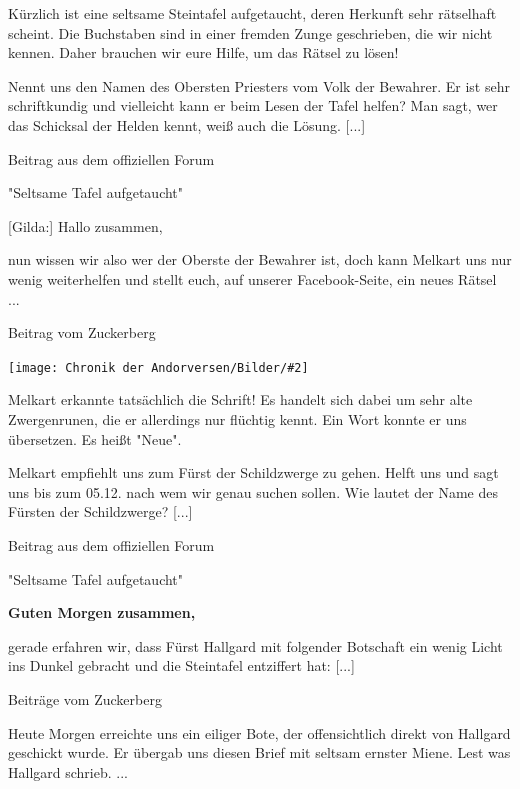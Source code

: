\documentclass[10pt, a4paper, oneside]{book}
\newcommand{\bildmitts}[2][height=0.32\textwidth,width=0.48\textwidth,keepaspectratio]{%
    \begin{center}
        \texttt{[image: Chronik der Andorversen/Bilder/\#2]}
    \end{center}
}
\begin{document}
\begin{multicols}{2}
Kürzlich ist eine seltsame Steintafel aufgetaucht, deren Herkunft sehr rätselhaft scheint. Die Buchstaben sind in einer fremden Zunge geschrieben, die wir nicht kennen. Daher brauchen wir eure Hilfe, um das Rätsel zu lösen!

Nennt uns den Namen des Obersten Priesters vom Volk der Bewahrer. Er ist sehr schriftkundig und vielleicht kann er beim Lesen der Tafel helfen? Man sagt, wer das Schicksal der Helden kennt, weiß auch die Lösung. [...]

\begin{center}
    Beitrag aus dem offiziellen Forum

    "Seltsame Tafel aufgetaucht"
\end{center}

[Gilda:] Hallo zusammen,

nun wissen wir also wer der Oberste der Bewahrer ist, doch kann Melkart uns nur wenig weiterhelfen und stellt euch, auf unserer Facebook-Seite, ein neues Rätsel ...

\begin{center}
    Beitrag vom Zuckerberg
\end{center}

\bildmitts{Seltsame Tafel Bild 2.jpg}

Melkart erkannte tatsächlich die Schrift! Es handelt sich dabei um sehr alte Zwergenrunen, die er allerdings nur flüchtig kennt. Ein Wort konnte er uns übersetzen. Es heißt "Neue".

Melkart empfiehlt uns zum Fürst der Schildzwerge zu gehen. Helft uns und sagt uns bis zum 05.12. nach wem wir genau suchen sollen. Wie lautet der Name des Fürsten der Schildzwerge? [...]

\begin{center}
    Beitrag aus dem offiziellen Forum

    "Seltsame Tafel aufgetaucht"
\end{center}

\textbf{Guten Morgen zusammen,}

gerade erfahren wir, dass Fürst Hallgard mit folgender Botschaft ein wenig Licht ins Dunkel gebracht und die Steintafel entziffert hat: [...] 

\begin{center}
    Beiträge vom Zuckerberg
\end{center}

Heute Morgen erreichte uns ein eiliger Bote, der offensichtlich direkt von Hallgard geschickt wurde. Er übergab uns diesen Brief mit seltsam ernster Miene. Lest was Hallgard schrieb. ...


\end{multicols}
\end{document}
